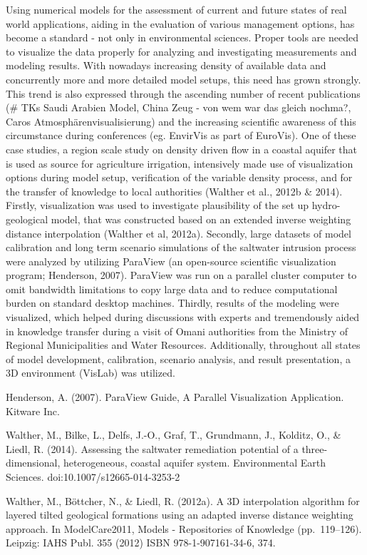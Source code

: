 Using numerical models for the assessment of current and future states
of real world applications, aiding in the evaluation of various
management options, has become a standard - not only in environmental
sciences. Proper tools are needed to visualize the data properly for
analyzing and investigating measurements and modeling results. With
nowadays increasing density of available data and concurrently more and
more detailed model setups, this need has grown strongly. This trend is
also expressed through the ascending number of recent publications (\#
TKs Saudi Arabien Model, China Zeug - von wem war das gleich nochma?,
Caros Atmosphärenvisualisierung) and the increasing scientific awareness
of this circumstance during conferences (eg. EnvirVis as part of
EuroVis). One of these case studies, a region scale study on density
driven flow in a coastal aquifer that is used as source for agriculture
irrigation, intensively made use of visualization options during model
setup, verification of the variable density process, and for the
transfer of knowledge to local authorities (Walther et al., 2012b \&
2014). Firstly, visualization was used to investigate plausibility of
the set up hydro-geological model, that was constructed based on an
extended inverse weighting distance interpolation (Walther et al,
2012a). Secondly, large datasets of model calibration and long term
scenario simulations of the saltwater intrusion process were analyzed by
utilizing ParaView (an open-source scientific visualization program;
Henderson, 2007). ParaView was run on a parallel cluster computer to
omit bandwidth limitations to copy large data and to reduce
computational burden on standard desktop machines. Thirdly, results of
the modeling were visualized, which helped during discussions with
experts and tremendously aided in knowledge transfer during a visit of
Omani authorities from the Ministry of Regional Municipalities and Water
Resources. Additionally, throughout all states of model development,
calibration, scenario analysis, and result presentation, a 3D
environment (VisLab) was utilized.

Henderson, A. (2007). ParaView Guide, A Parallel Visualization
Application. Kitware Inc.

Walther, M., Bilke, L., Delfs, J.-O., Graf, T., Grundmann, J., Kolditz,
O., \& Liedl, R. (2014). Assessing the saltwater remediation potential
of a three-dimensional, heterogeneous, coastal aquifer system.
Environmental Earth Sciences. doi:10.1007/s12665-014-3253-2

Walther, M., Böttcher, N., \& Liedl, R. (2012a). A 3D interpolation
algorithm for layered tilted geological formations using an adapted
inverse distance weighting approach. In ModelCare2011, Models -
Repositories of Knowledge (pp.~119--126). Leipzig: IAHS Publ. 355 (2012)
ISBN 978-1-907161-34-6, 374.


